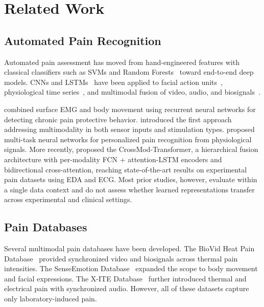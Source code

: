 \documentclass{article}
\begin{document}
\section{Related Work}

\subsection{Automated Pain Recognition}

Automated pain assessment has moved from hand-engineered features with classical classifiers such as SVMs and Random Forests~\citep{gruss2015pain,breiman2001random} toward end-to-end deep models. CNNs and LSTMs~\citep{hochreiter1997lstm} have been applied to facial action units~\citep{rodriguez2017deep}, physiological time series~\citep{thiam2019exploring,kessler2019pain}, and multimodal fusion of video, audio, and biosignals~\citep{salekin2019multichannel,werner2019twofold}.

\citet{wang2019recurrent} combined surface EMG and body movement using recurrent neural networks for detecting chronic pain protective behavior. \citet{werner2019twofold} introduced the first approach addressing multimodality in both sensor inputs and stimulation types. \citet{lopez2017multi} proposed multi-task neural networks for personalized pain recognition from physiological signals. More recently, \citet{farmani2025crossmod} proposed the CrossMod-Transformer, a hierarchical fusion architecture with per-modality FCN + attention-LSTM encoders and bidirectional cross-attention, reaching state-of-the-art results on experimental pain datasets using EDA and ECG. Most prior studies, however, evaluate within a single data context and do not assess whether learned representations transfer across experimental and clinical settings.

\subsection{Pain Databases}

Several multimodal pain databases have been developed. The BioVid Heat Pain Database~\citep{walter2013biovid} provided synchronized video and biosignals across thermal pain intensities. The SenseEmotion Database~\citep{velana2016senseemotion} expanded the scope to body movement and facial expressions. The X-ITE Database~\citep{gruss2019multimodal} further introduced thermal and electrical pain with synchronized audio. However, all of these datasets capture only laboratory-induced pain.
\end{document}
